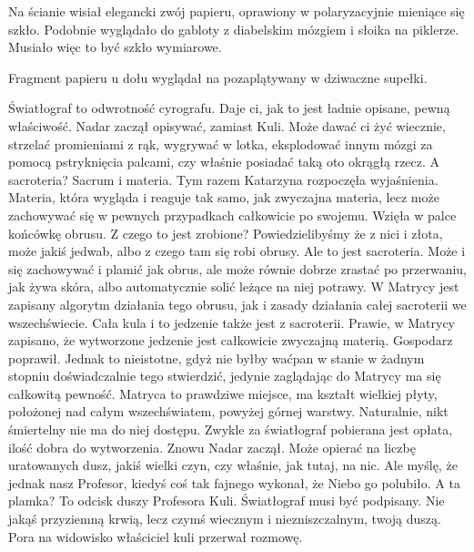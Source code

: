 Na ścianie wisiał elegancki zwój papieru, oprawiony w polaryzacyjnie mieniące się szkło.
Podobnie wyglądało do gabloty z diabelskim mózgiem i słoika na piklerze. Musiało więc to być szkło wymiarowe.


Fragment papieru u dołu wyglądał na pozaplątywany w dziwaczne supełki.

\begin{dialogue}
\ds{} Światłograf to odwrotność cyrografu. Daje ci, jak to jest ładnie opisane, pewną właściwość. \dm{} Nadar zaczął opisywać, zamiast Kuli. \dm{}
Może dawać ci żyć wiecznie, strzelać promieniami z rąk, wygrywać w lotka, eksplodować innym mózgi za pomocą pstryknięcia palcami, czy właśnie posiadać taką oto okrągłą rzecz.
\ds{} A sacroteria? 
\ds{} Sacrum i materia. \dm{} Tym razem Katarzyna rozpoczęła wyjaśnienia. \dm{} 
Materia, która wygląda i reaguje tak samo, jak zwyczajna materia, lecz może zachowywać się w pewnych przypadkach całkowicie po swojemu. \dm{} 
Wzięła w palce końcówkę obrusu. \dm{} Z czego to jest zrobione? 
Powiedzielibyśmy że z nici i złota, może jakiś jedwab, albo z czego tam się robi obrusy.
Ale to jest sacroteria. Może i się zachowywać i plamić jak obrus, ale może równie dobrze zrastać po przerwaniu, jak żywa skóra, albo automatycznie solić leżące na niej potrawy.
W Matrycy jest zapisany algorytm działania tego obrusu, jak i zasady działania całej sacroterii we wszechświecie. 
Cała kula i to jedzenie także jest z sacroterii.
\ds{} Prawie, w Matrycy zapisano, że wytworzone jedzenie jest całkowicie zwyczajną materią. \dm{} Gospodarz poprawił. \dm{}
Jednak to nieistotne, gdyż nie byłby waćpan w stanie w żadnym stopniu doświadczalnie tego stwierdzić, jedynie zaglądając do Matrycy ma się całkowitą pewność. 
Matryca to prawdziwe miejsce, ma kształt wielkiej płyty, położonej nad całym wszechświatem, powyżej górnej warstwy. Naturalnie, nikt śmiertelny nie ma do niej dostępu.
\ds{} Zwykle za światłograf pobierana jest opłata, ilość dobra do wytworzenia. \dm{} Znowu Nadar zaczął. \dm{} 
Może opierać na liczbę uratowanych dusz, jakiś wielki czyn, czy właśnie, jak tutaj, na nic. 
Ale myślę, że jednak nasz Profesor, kiedyś coś tak fajnego wykonał, że Niebo go polubiło.
\ds{} A ta plamka?
\ds{} To odcisk duszy Profesora Kuli. Światłograf musi być podpisany. Nie jakąś przyziemną krwią, lecz czymś wiecznym i niezniszczalnym, twoją duszą.
\ds{} Pora na widowisko \dm{} właściciel kuli przerwał rozmowę.
\end{dialogue}


